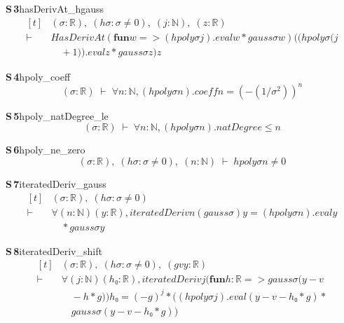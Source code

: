 \documentclass[conference]{IEEEtran}
\theoremstyle{definition}
\newcommand{\lean}[1]{\textsf{\footnotesize #1}}
\begin{document}
\noindent\textbf{S\,3}\quad\lean{hasDerivAt\_hgauss}
{\footnotesize\[ \begin{aligned}[t]
&(\sigma : \mathbb{R} ),\; (\mathit{hσ} : \sigma \neq 0),\; (\mathit{j} : \mathbb{N} ),\; (\mathit{z} : \mathbb{R} )\\
\vdash\;&\mathit{HasDerivAt} (\mathbf{fun} \mathit{w} => (\mathit{hpoly} \sigma \mathit{j}).\mathit{eval} \mathit{w} * \mathit{gauss} \sigma \mathit{w}) ((\mathit{hpoly} \sigma (\mathit{j}\\
&\quad + 1)).\mathit{eval} \mathit{z} * \mathit{gauss} \sigma \mathit{z}) \mathit{z}
\end{aligned} \]}

\noindent\textbf{S\,4}\quad\lean{hpoly\_coeff}
{\footnotesize\[ (\sigma : \mathbb{R} ) \;\vdash\; \forall \mathit{n} : \mathbb{N} , (\mathit{hpoly} \sigma \mathit{n}).\mathit{coeff} \mathit{n} = (-(1 / \sigma ^{2})) ^{\mathit{n}} \]}

\noindent\textbf{S\,5}\quad\lean{hpoly\_natDegree\_le}
{\footnotesize\[ (\sigma : \mathbb{R} ) \;\vdash\; \forall \mathit{n} : \mathbb{N} , (\mathit{hpoly} \sigma \mathit{n}).\mathit{natDegree} \leq \mathit{n} \]}

\noindent\textbf{S\,6}\quad\lean{hpoly\_ne\_zero}
{\footnotesize\[ (\sigma : \mathbb{R} ),\; (\mathit{hσ} : \sigma \neq 0),\; (\mathit{n} : \mathbb{N} ) \;\vdash\; \mathit{hpoly} \sigma \mathit{n} \neq 0 \]}

\noindent\textbf{S\,7}\quad\lean{iteratedDeriv\_gauss}
{\footnotesize\[ \begin{aligned}[t]
&(\sigma : \mathbb{R} ),\; (\mathit{hσ} : \sigma \neq 0)\\
\vdash\;&\forall (\mathit{n} : \mathbb{N} ) (\mathit{y} : \mathbb{R} ), \mathit{iteratedDeriv} \mathit{n} (\mathit{gauss} \sigma ) \mathit{y} = (\mathit{hpoly} \sigma \mathit{n}).\mathit{eval} \mathit{y}\\
&\quad * \mathit{gauss} \sigma \mathit{y}
\end{aligned} \]}

\noindent\textbf{S\,8}\quad\lean{iteratedDeriv\_shift}
{\footnotesize\[ \begin{aligned}[t]
&(\sigma : \mathbb{R} ),\; (\mathit{hσ} : \sigma \neq 0),\; (\mathit{g} \mathit{v} \mathit{y} : \mathbb{R} )\\
\vdash\;&\forall (\mathit{j} : \mathbb{N} ) (\mathit{h₀} : \mathbb{R} ), \mathit{iteratedDeriv} \mathit{j} (\mathbf{fun} \mathit{h} : \mathbb{R} => \mathit{gauss} \sigma (\mathit{y} - \mathit{v}\\
&\quad - \mathit{h} * \mathit{g})) \mathit{h₀} = (-\mathit{g}) ^{\mathit{j}} * ((\mathit{hpoly} \sigma \mathit{j}).\mathit{eval} (\mathit{y} - \mathit{v} - \mathit{h₀} * \mathit{g}) *\\
&\quad \mathit{gauss} \sigma (\mathit{y} - \mathit{v} - \mathit{h₀} * \mathit{g}))
\end{aligned} \]}
\end{document}
